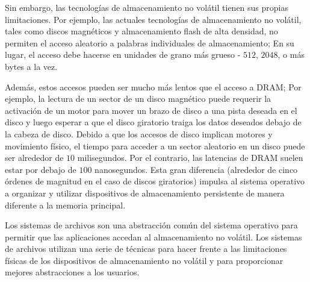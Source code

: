 \documentclass[10pt]{book}
\begin{document}
Sin embargo, las tecnologías de almacenamiento no volátil tienen sus propias limitaciones. Por ejemplo, las actuales tecnologías de almacenamiento no volátil, tales como discos magnéticos y almacenamiento flash de alta densidad, no permiten el acceso aleatorio a palabras individuales de almacenamiento; En su lugar, el acceso debe hacerse en unidades de grano más grueso - $512$, $2048$, o más bytes a la vez.

Además, estos accesos pueden ser mucho más lentos que el acceso a DRAM; Por ejemplo, la lectura de un sector de un disco magnético puede requerir la activación de un motor para mover un brazo de disco a una pista deseada en el disco y luego esperar a que el disco giratorio traiga los datos deseados debajo de la cabeza de disco. Debido a que los accesos de disco implican motores y movimiento físico, el tiempo para acceder a un sector aleatorio en un disco puede ser alrededor de $10$ milisegundos. Por el contrario, las latencias de DRAM suelen estar por debajo de $100$ nanosegundos. Esta gran diferencia (alrededor de cinco órdenes de magnitud en el caso de discos giratorios) impulsa al sistema operativo a organizar y utilizar dispositivos de almacenamiento persistente de manera diferente a la memoria principal.

Los sistemas de archivos son una abstracción común del sistema operativo para permitir que las aplicaciones accedan al almacenamiento no volátil. Los sistemas de archivos utilizan una serie de técnicas para hacer frente a las limitaciones físicas de los dispositivos de almacenamiento no volátil y para proporcionar mejores abstracciones a los usuarios.
\end{document}
